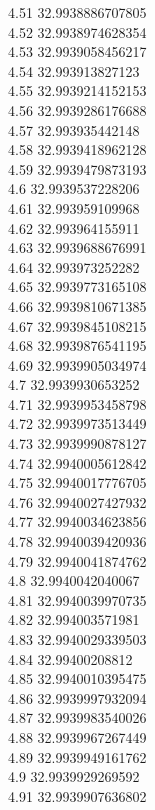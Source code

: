 {4.51	32.9938886707805\\
4.52	32.9938974628354\\
4.53	32.9939058456217\\
4.54	32.993913827123\\
4.55	32.9939214152153\\
4.56	32.9939286176688\\
4.57	32.993935442148\\
4.58	32.9939418962128\\
4.59	32.9939479873193\\
4.6	32.9939537228206\\
4.61	32.993959109968\\
4.62	32.993964155911\\
4.63	32.9939688676991\\
4.64	32.993973252282\\
4.65	32.9939773165108\\
4.66	32.9939810671385\\
4.67	32.9939845108215\\
4.68	32.9939876541195\\
4.69	32.9939905034974\\
4.7	32.9939930653252\\
4.71	32.9939953458798\\
4.72	32.9939973513449\\
4.73	32.9939990878127\\
4.74	32.9940005612842\\
4.75	32.9940017776705\\
4.76	32.9940027427932\\
4.77	32.9940034623856\\
4.78	32.9940039420936\\
4.79	32.9940041874762\\
4.8	32.9940042040067\\
4.81	32.9940039970735\\
4.82	32.994003571981\\
4.83	32.9940029339503\\
4.84	32.99400208812\\
4.85	32.9940010395475\\
4.86	32.9939997932094\\
4.87	32.9939983540026\\
4.88	32.9939967267449\\
4.89	32.9939949161762\\
4.9	32.9939929269592\\
4.91	32.9939907636802\\
}
